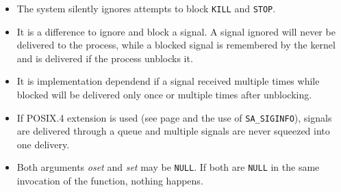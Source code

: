 


\label{SIGPROCMASK}

\begin{itemize}
\item The system silently ignores attempts to block \texttt{KILL} and
\texttt{STOP}.
\item It is a difference to ignore and block a signal.  A signal ignored will
never be delivered to the process, while a blocked signal is remembered by the
kernel and is delivered if the process unblocks it.
\item It is implementation dependend if a signal received multiple times while
blocked will be delivered only once or multiple times after unblocking.
\item If POSIX.4 extension is used (see page
\pageref{REALTIMEEXTENSIONS} and the use of \texttt{SA\_SIGINFO}), signals are
delivered through a queue and multiple signals are never squeezed into one
delivery.
\item Both arguments \emph{oset} and \emph{set} may be \texttt{NULL}.  If both
are \texttt{NULL} in the same invocation of the function, nothing happens.
\end{itemize}

